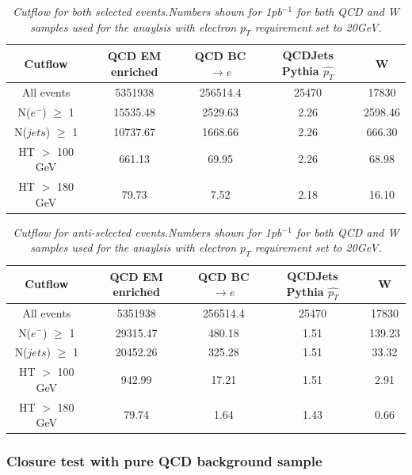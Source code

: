 \begin{table}[h!]
\begin{center}
\begin{tabular}{|c||c|c|c|c|}
\hline
Cutflow & QCD EM enriched & QCD BC$\rightarrow e$ & QCDJets Pythia $\hat{p_{T}}$ &  W \\
\hline
\hline
All events & 5351938 & 256514.4 & 25470 & 17830 \\
N($e^{-}$) $\geq$ 1 & 15535.48 & 2529.63 & 2.26 & 2598.46\\
N($jets$) $\geq$ 1 & 10737.67 & 1668.66 & 2.26 & 666.30\\
HT $>$ 100 GeV & 661.13 & 69.95 & 2.26 & 68.98\\
HT $>$ 180 GeV & 79.73 & 7.52 & 2.18 & 16.10\\
\hline
\end{tabular}
\end{center}
\caption{\textit{Cutflow for both selected events.Numbers shown for 1pb$^{-1}$ for both QCD and W samples used for the anaylsis with electron $p_{T}$ requirement set to 20GeV.}}
\label{tab:CF_S_20}
\end{table}

\begin{table}[h!]
\begin{center}
\begin{tabular}{|c||c|c|c|c|}
\hline
Cutflow & QCD EM enriched & QCD BC$\rightarrow e$ & QCDJets Pythia $\hat{p_{T}}$ &  W \\
\hline
All events & 5351938 & 256514.4 & 25470 & 17830\\
N($e^{-}$) $\geq$ 1 & 29315.47 & 480.18 & 1.51 & 139.23 \\
N($jets$) $\geq$ 1 & 20452.26 & 325.28 & 1.51 & 33.32\\
HT $>$ 100 GeV & 942.99 & 17.21 & 1.51 & 2.91\\
HT $>$ 180 GeV & 79.74 & 1.64 & 1.43 & 0.66\\
\hline
\end{tabular}
\end{center}
\caption{\textit{Cutflow for anti-selected events.Numbers shown for 1pb$^{-1}$ for both QCD and W samples used for the anaylsis with electron $p_{T}$ requirement set to 20GeV.}}
\label{tab:CF_AS_20}
\end{table}

\subsubsection{Closure test with pure QCD background sample}

